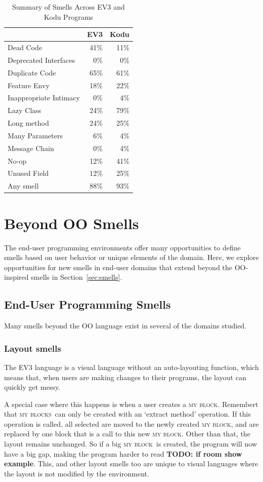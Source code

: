 \documentclass{sig-alternate}
\newcommand{\todo}[1]{\textbf{TODO: #1}}
\newcommand{\mbs}{\textsc{my blocks}}
\newcommand{\mb}{\textsc{my block}}
\begin{document}
\begin{table}
\caption{Summary of Smells Across EV3 and Kodu Programs \label{tab:smellsummary}}
\begin{center}
\begin{tabular}{l | r r}
&EV3&Kodu\\ \hline
Dead Code&41\%&11\%\\
Deprecated Interfaces & 0\% & 0\%\\
Duplicate Code&65\%&61\%\\
Feature Envy&18\%&22\%\\
Inappropriate Intimacy&0\%&4\%\\
Lazy Class&24\%&79\%\\
Long method&24\%&25\%\\
Many Parameters&6\%&4\%\\
Message Chain&0\%&4\%\\
No-op&12\%&41\%\\
Unused Field&12\%&25\%\\ \hline
Any smell & 88\% & 93\%
\end{tabular}
\end{center}
\end{table}

\section{Beyond OO Smells}
\label{sec:beyond}

\label{sec:smells:domain}
The end-user programming environments offer many opportunities to define smells based on user behavior or unique elements of the domain. Here, we explore opportunities for new smells in end-user domains that extend beyond the OO-inspired smells in Section~\ref{sec:smells}. 

\subsection{End-User Programming Smells}
Many smells beyond the OO language exist in several of the domains studied. 

\subsubsection{Layout smells}
The EV3 language is a visual language without an auto-layouting function, which means that, when users are making changes to their programs, the layout can quickly get messy. 

A special case where this happens is when a user creates a \mb. Remembert that \mbs~can only be created with an `extract method' operation. If this operation is called, all selected are moved to the newly created \mb, and are replaced by one block that is a call to this new \mb. Other than that, the layout remains unchanged. So if a big \mb~is created, the program will now have a big gap, making the program harder to read \todo{if room show example}. This, and other layout smells too are unique to visual languages where the layout is not modified by the environment.
\end{document}
